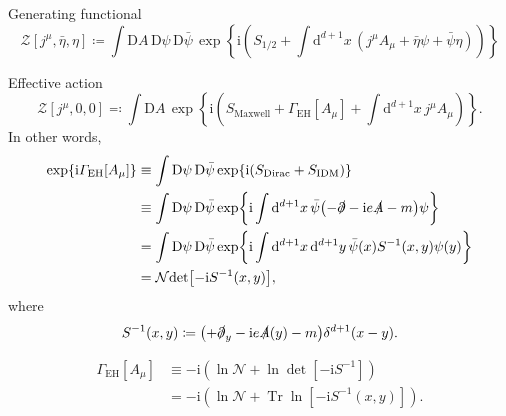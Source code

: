 \documentclass[12pt]{article}
\newcommand\mi{\mathrm{i}} %
\newcommand\dif{\mathrm{d}}
\newcommand\Dif{\mathrm{D}}
\DeclareMathOperator{\Tr}{Tr}
\newcommand{\rbr}[1]{{\left(#1\right)}}
\newcommand{\rfun}[2]{{#1}\mathopen{}\left(#2\right)\mathclose{}}
\newcommand{\sfun}[2]{{#1}\mathopen{}\left[#2\right]\mathclose{}}
\newcommand{\cfun}[2]{{#1}\mathopen{}\left\{#2\right\}\mathclose{}}
\begin{document}
Generating functional
\begin{equation}
\sfun{\mathcal{Z}}{j^\mu, \bar\eta, \eta} \coloneqq
\int\Dif A\,\Dif\psi\,\Dif\bar\psi\,\cfun{\exp}{\mi\rbr{S_{1/2}
+\int\dif^{d+1} x\,\rbr{j^\mu A_\mu + \bar\eta \psi+\bar\psi \eta}}}
\end{equation}

Effective action
\begin{equation}
\sfun{\mathcal{Z}}{j^\mu, 0, 0} \eqqcolon
\int\Dif A\,\cfun{\exp}{\mi\rbr{S_\text{Maxwell} + 
\sfun{\varGamma_\text{EH}}{A_\mu}
+\int\dif^{d+1} x \,j^\mu A_\mu}}.
\end{equation}
In other words,
\begin{align}
\cfun{\exp}{\mi\sfun{\varGamma_\text{EH}}{A_\mu}} &\equiv \int
\Dif\psi\,\Dif\bar\psi\,\cfun{\exp}{\mi\rbr{S_\text{Dirac}+S_\text{IDM}}}
\nonumber \\
&\equiv \int\Dif\psi\,\Dif\bar\psi\,\cfun{\exp}{\mi\int\dif^{d+1} x\,
\bar{\psi} \rbr{-\slashed{\partial}-\mi e \slashed{A} - m}\psi}
\nonumber \\
&= \int\Dif\psi\,\Dif\bar\psi\,\cfun{\exp}{\mi\int\dif^{d+1} x\,\dif^{d+1} y\,
\rfun{\bar\psi}{x} \rfun{S^{-1}}{x, y} \rfun{\psi}{y}}
\nonumber \\
&= \mathcal{N}\sfun{\det}{-\mi \rfun{S^{-1}}{x, y}},
\end{align}
where
\begin{equation}
\rfun{S^{-1}}{x, y} \coloneqq \rbr{+\slashed{\partial}_y-\mi e 
\rfun{\slashed{A}}{y} - m}\rfun{\delta^{d+1}}{x-y}.
\end{equation}

\begin{align}
\sfun{\varGamma_\text{EH}}{A_\mu} &\equiv
-\mi\rbr{\ln\mathcal{N} + \ln \sfun{\det}{-\mi S^{-1}}} \nonumber \\
&= -\mi \rbr{\ln\mathcal{N} + \Tr \sfun{\ln}{-\mi \rfun{S^{-1}}{x, y}}}.
\end{align}
\end{document}
